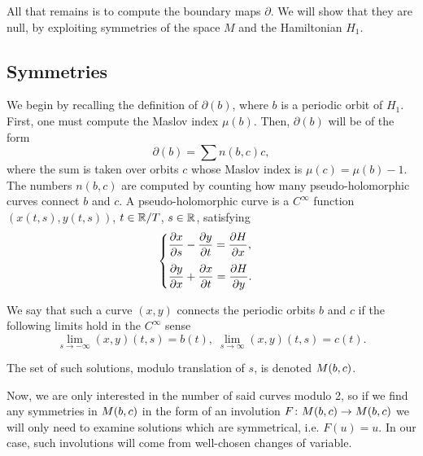 All that remains is to compute the boundary maps $\partial$. We will show that they are null, by exploiting symmetries of the space $M$ and the Hamiltonian $H_1$.

\subsection{Symmetries}

We begin by recalling the definition of $\partial(b)$, where $b$ is a periodic orbit of $H_1$. First, one must compute the Maslov index $\mu(b)$. Then, $\partial(b)$ will be of the form
\begin{equation}
\partial(b) = \sum n(b,c) c,
\end{equation}
where the sum is taken over orbits $c$ whose Maslov index is $\mu(c) = \mu(b)-1$. The numbers $n(b,c)$ are computed by counting how many pseudo-holomorphic curves connect $b$ and $c$. A pseudo-holomorphic curve is a $C^\infty$ function $(x(t,s), y(t,s))$, $t \in \mathbb{R} / T$, $s \in \mathbb{R}$, satisfying
\begin{equation}
\begin{cases}
\displaystyle \diffp x s - \diffp y t = \diffp H x,\\[1em]
\displaystyle \diffp y x + \diffp x t = \diffp H y.
\end{cases}
\end{equation}

We say that such a curve $(x,y)$ connects the periodic orbits $b$ and $c$ if the following limits hold in the $C^\infty$ sense
\begin{equation}
\lim_{s \to -\infty} (x,y)(t,s) = b(t), \; \lim_{s \to \infty} (x,y)(t,s) = c(t).
\end{equation}

The set of such solutions, modulo translation of $s$, is denoted $M(b,c)$.

Now, we are only interested in the number of said curves modulo 2, so if we find any symmetries in $M(b,c)$ in the form of an involution $F \colon M(b,c) \to M(b,c)$ we will only need to examine solutions which are symmetrical, i.e. $F(u) = u$. In our case, such involutions will come from well-chosen changes of variable.